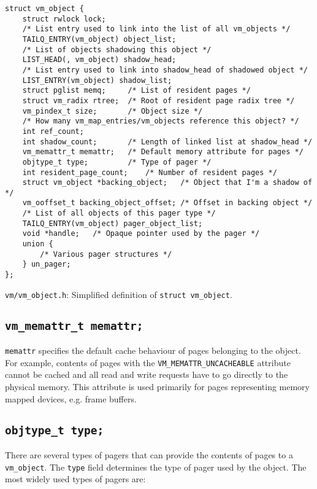 \documentclass[shortabstract, english]{iithesis}
\begin{document}
\begin{listing}[H]
\begin{verbatim}
struct vm_object {
    struct rwlock lock;
    /* List entry used to link into the list of all vm_objects */
    TAILQ_ENTRY(vm_object) object_list;
    /* List of objects shadowing this object */
    LIST_HEAD(, vm_object) shadow_head;
    /* List entry used to link into shadow_head of shadowed object */
    LIST_ENTRY(vm_object) shadow_list;
    struct pglist memq;     /* List of resident pages */
    struct vm_radix rtree;  /* Root of resident page radix tree */
    vm_pindex_t size;       /* Object size */
    /* How many vm_map_entries/vm_objects reference this object? */
    int ref_count;
    int shadow_count;       /* Length of linked list at shadow_head */
    vm_memattr_t memattr;   /* Default memory attribute for pages */
    objtype_t type;         /* Type of pager */
    int resident_page_count;    /* Number of resident pages */
    struct vm_object *backing_object;   /* Object that I'm a shadow of */
    vm_ooffset_t backing_object_offset; /* Offset in backing object */
    /* List of all objects of this pager type */
    TAILQ_ENTRY(vm_object) pager_object_list;
    void *handle;   /* Opaque pointer used by the pager */
    union {
        /* Various pager structures */
    } un_pager;
};
\end{verbatim}
\caption{\texttt{vm/vm\_object.h}: Simplified definition of \texttt{struct vm_object}.}
\end{listing}

\subsection*{\texttt{vm_memattr_t memattr;}}

\texttt{memattr} specifies the default cache behaviour
\cite[Section~11.3]{bib:intel} of pages belonging to the object. For example,
contents of pages with the \texttt{VM_MEMATTR_UNCACHEABLE} attribute
cannot be cached and all read and write requests have to go directly to the
physical memory. This attribute is used primarily for pages representing memory
mapped devices, e.g. frame buffers.

\subsection*{\texttt{objtype_t type;}}

There are several types of pagers that can provide the contents of pages to a
\texttt{vm_object}. The \texttt{type} field determines the type of
pager used by the object. The most widely used types of pagers are:
\end{document}
